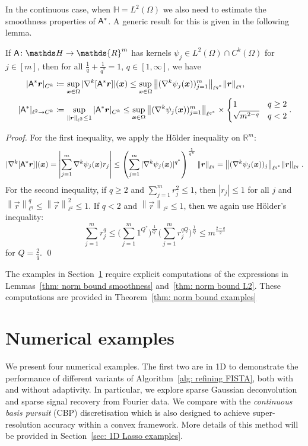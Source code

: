 \documentclass[smallextended]{svjour3}
\let\F\mathds\let\C\mathcal\newcommand{\R}{\F{R}}\newcommand{\A}{\tens{A}}
\newcommand{\norm}[1]{{\left\lVert #1 \right\rVert}}
\newcommand{\splitln}[4]{\begin{cases} #1 & #2 \\ #3 & #4\end{cases}}
\newcommand{\1}{\F{1}}
\newcommand{\Domain}{\Omega}\newcommand{\domain}{\omega}
\begin{document}
	
	In the continuous case, when $\F H=L^2(\Domain)$ we also need to estimate the smoothness properties of $\A^*$. A generic result for this is given in the following lemma.
	\begin{lemma}\label{thm: norm bound smoothness}
		If $\A\colon \F H \to \R^m$ has kernels $\psi_j\in L^2(\Domain)\cap C^k(\Domain)$ for $j\in[m]$, then for all $\frac1q+\frac1{q^*}=1$, $q\in[1,\infty]$, we have
		\begin{align}
			|\A^*\vec{r}|_{C^k}&\coloneqq \sup_{\vec{x}\in\Domain} |\nabla^k[\A^*\vec{r}]|(\vec{x}) \leq \sup_{\vec{x}\in\Domain}\norm{(\nabla^k\psi_j(\vec{x}))_{j=1}^m}_{\ell^{q^*}}\norm{\vec{r}}_{\ell^q},
			\\ |\A^*|_{\ell^2\to C^k}&\coloneqq \sup_{\norm{\vec{r}}_{\ell^2}\leq 1} |\A^*\vec{r}|_{C^k} \leq \sup_{\vec{x}\in\Domain}\norm{(\nabla^k\psi_j(\vec{x}))_{j=1}^m}_{\ell^{q^*}}\times \splitln{1}{q\geq 2}{\sqrt{m^{2-q}}}{q<2}.
		\end{align}
	\end{lemma}
	\begin{proof}
		For the first inequality, we apply the H\"older inequality on $\R^m$:
		$$ |\nabla^k[\A^*\vec{r}]|(\vec{x}) = \left|\sum_{j=1}^m\nabla^k\psi_j(\vec{x})r_j\right|
		\leq \left(\sum_{j=1}^m|\nabla^k\psi_j(\vec{x})|^{q^*}\right)^{\frac{1}{q^*}}\norm{\vec{r}}_{\ell^q} = \norm{(\nabla^k\psi_j(\vec{x}))_j}_{\ell^{q^*}}\norm{\vec{r}}_{\ell^q}\;.$$
		For the second inequality, if $q\geq2$ and $\sum_{j=1}^m r_j^2\leq 1$, then $|r_j|\leq 1$ for all $j$ and $\norm{\vec{r}}_{\ell^q}^q\leq \norm{\vec{r}}_{\ell^2}^2\leq 1$. If $q<2$ and $\norm{\vec{r}}_{\ell^2}\leq 1$, then we again use H\"older's inequality:
		$$\sum_{j=1}^m r_j^q \leq \Big(\sum_{j=1}^m 1^{Q^*}\Big)^{\frac1{Q^*}} \Big(\sum_{j=1}^m r_j^{qQ}\Big)^{\frac1{Q}} \leq m^{\frac{2-q}{2}}$$
		for $Q = \frac2q$.
	\qed\end{proof}
	
	The examples in Section~\ref{sec: numerics} require explicit computations of the expressions in Lemmas~\ref{thm: norm bound smoothness} and~\ref{thm: norm bound L2}. These computations are provided in Theorem~\ref{thm: norm bound examples}
	
	\section{Numerical examples}\label{sec: numerics}
	We present four numerical examples. The first two are in 1D to demonstrate the performance of different variants of Algorithm~\ref{alg: refining FISTA}, both with and without adaptivity. In particular, we explore sparse Gaussian deconvolution and sparse signal recovery from Fourier data. We compare with the \emph{continuous basis pursuit} (CBP) discretisation \cite{Ekanadham2011,Duval2017b} which is also designed to achieve super-resolution accuracy within a convex framework. More details of this method will be provided in Section~\ref{sec: 1D Lasso examples}.
	
\end{document}
